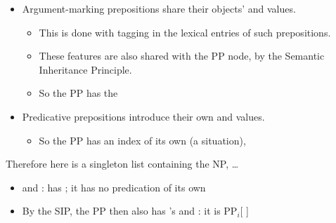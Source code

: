 \documentclass[a4paper,landscape,headrule,footrule]{foils}
\begin{document}
  \begin{itemize}
  \item Argument-marking prepositions share their
    objects'  and  values.
    \begin{itemize}
    \item This is done with tagging in the lexical
      entries of such prepositions.
    \item These features are also shared with the PP
      node, by the Semantic Inheritance Principle.
    \item So the PP has the 
    \end{itemize}
  \item Predicative prepositions introduce their own
 and  values.
\begin{itemize}
\item So the PP has an index of its own (a situation), 
\end{itemize}
\end{itemize}

\hfill
{}

Therefore  here is a singleton list containing the NP, \ldots
\begin{itemize}\addtolength{\itemsep}{-1.5ex}
\item \avm{\1} and \avm{\2}:  has ; it has no predication of its own
\item By the SIP, the PP  then also has 's
   and : it is PP$_i$[ ]
\end{itemize}
\end{document}
